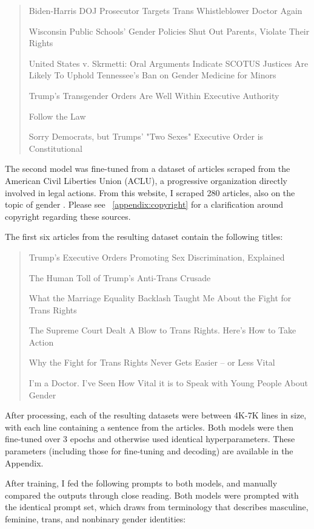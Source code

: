 \documentclass[anonymous,review]{acmart}
\begin{document}
\begin{quote}
Biden-Harris DOJ Prosecutor Targets Trans Whistleblower Doctor Again

Wisconsin Public Schools' Gender Policies Shut Out Parents, Violate Their Rights

United States v. Skrmetti: Oral Arguments Indicate SCOTUS Justices Are Likely To Uphold Tennessee's Ban on Gender Medicine for Minors

Trump's Transgender Orders Are Well Within Executive Authority

Follow the Law

Sorry Democrats, but Trumps' "Two Sexes" Executive Order is Constitutional
\end{quote}

The second model was fine-tuned from a dataset of articles scraped from the American Civil Liberties Union (ACLU), a progressive organization directly involved in legal actions. From this website, I scraped 280 articles, also on the topic of gender \citep{aclu_2026}. Please see ~\autoref{appendix:copyright} for a clarification around copyright regarding these sources.

The first six articles from the resulting dataset contain the following titles:

\begin{quote}
Trump's Executive Orders Promoting Sex Discrimination, Explained

The Human Toll of Trump's Anti-Trans Crusade

What the Marriage Equality Backlash Taught Me About the Fight for Trans Rights

The Supreme Court Dealt A Blow to Trans Rights. Here's How to Take Action

Why the Fight for Trans Rights Never Gets Easier – or Less Vital

I'm a Doctor. I've Seen How Vital it is to Speak with Young People About Gender
\end{quote}

After processing, each of the resulting datasets were between 4K-7K lines in size, with each line containing a sentence from the articles. Both models were then fine-tuned over 3 epochs and otherwise used identical hyperparameters. These parameters (including those for fine-tuning and decoding) are available in the Appendix.

After training, I fed the following prompts to both models, and manually compared the outputs through close reading. Both models were prompted with the identical prompt set, which draws from terminology that describes masculine, feminine, trans, and nonbinary gender identities:
\end{document}

